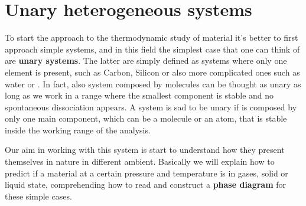 \section{Unary heterogeneous systems}

To start the approach to the thermodynamic study of material it's better to first approach simple systems, and in this field the simplest case that one can think of are \textbf{unary systems}. The latter are simply defined as systems where only one element is present, such as Carbon, Silicon or also more complicated ones such as water or . In fact, also system composed by molecules can be thought as unary as long as we work in a range where the smallest component is stable and no spontaneous dissociation appears.
{
    A system is sad to be unary if is composed by only one main component, which can be a molecule or an atom, that is stable inside the working range of the analysis.
}

\noindent
Our aim in working with this system is start to understand how they present themselves in nature in different ambient. Basically we will explain how to predict if a material at a certain pressure and temperature is in gases, solid or liquid state, comprehending how to read and construct a \textbf{phase diagram} for these simple cases.

